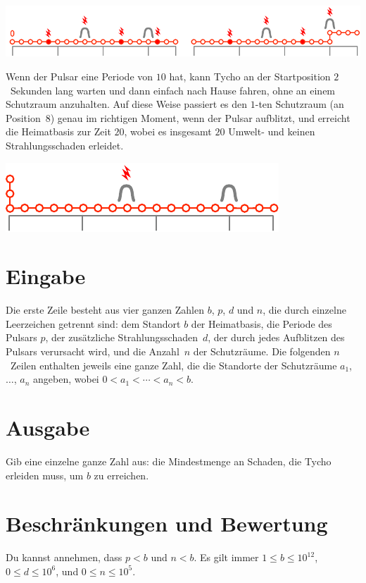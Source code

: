 \includegraphics[width=.8\textwidth]{img/sample1_2.pdf}

Wenn der Pulsar eine Periode von $10$ hat, kann Tycho an der Startposition $2$~Sekunden lang warten und dann einfach nach Hause fahren, ohne an einem Schutzraum anzuhalten.
Auf diese Weise passiert es den $1$-ten Schutzraum (an Position~$8$) genau im richtigen Moment, wenn der Pulsar aufblitzt, und erreicht die Heimatbasis zur Zeit $20$, wobei es insgesamt $20$ Umwelt- und keinen Strahlungsschaden erleidet.

\includegraphics[width=.4\textwidth]{img/sample3.pdf}

\section*{Eingabe}

Die erste Zeile besteht aus vier ganzen Zahlen $b$, $p$, $d$ und $n$, die durch einzelne Leerzeichen getrennt sind:
dem Standort $b$ der Heimatbasis,
die Periode des Pulsars $p$,
der zusätzliche Strahlungsschaden~$d$, der durch jedes Aufblitzen des Pulsars verursacht wird,
und die Anzahl~$n$ der Schutzräume.
Die folgenden $n$~Zeilen enthalten jeweils eine ganze Zahl, die die Standorte der Schutzräume $a_1$, $\ldots$, $a_n$ angeben, wobei 
$0<a_1<\cdots <a_n< b$. %

\section*{Ausgabe}

Gib eine einzelne ganze Zahl aus: die Mindestmenge an Schaden, die Tycho erleiden muss, um $b$ zu erreichen.

\section*{Beschränkungen und Bewertung}

Du kannst annehmen, dass
$p < b$ %
und
$n < b$. %
Es gilt immer
$1\leq b\leq 10^{12}$, %
$0\leq d \leq 10^6$, %
und
$0\leq n \leq 10^5$. %

